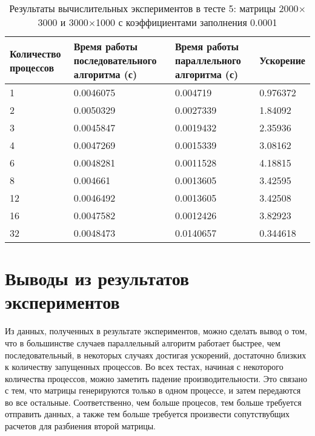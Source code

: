 \documentclass{report}
\begin{document}
\begin{table}[H]
    \caption{Результаты вычислительных экспериментов в тесте 5: матрицы 2000\(\times\)3000 и 3000\(\times\)1000 с коэффициентами заполнения 0.0001}
    \centering
    \begin{tabular}{|m{2cm}|m{5cm}|m{5cm}|m{2cm}|}
        \toprule
        Количество процессов & Время работы последовательного алгоритма (с) & Время работы параллельного алгоритма (с) & Ускорение \\
        \midrule
        1  & 0.0046075 & 0.004719  & 0.976372 \\
        2  & 0.0050329 & 0.0027339 & 1.84092  \\
        3  & 0.0045847 & 0.0019432 & 2.35936  \\
        4  & 0.0047269 & 0.0015339 & 3.08162  \\
        6  & 0.0048281 & 0.0011528 & 4.18815  \\
        8  & 0.004661  & 0.0013605 & 3.42595  \\
        12 & 0.0046492 & 0.0013605 & 3.42508  \\
        16 & 0.0047582 & 0.0012426 & 3.82923  \\
        32 & 0.0048473 & 0.0140657 & 0.344618 \\
        \bottomrule
    \end{tabular}
\end{table}

\clearpage

\section*{Выводы из результатов экспериментов}

\par Из данных, полученных в результате экспериментов, можно сделать вывод о том, что в большинстве случаев параллельный алгоритм работает быстрее, чем последовательный, в некоторых случаях достигая ускорений, достаточно близких к количеству запущенных процессов. Во всех тестах, начиная с некоторого количества процессов, можно заметить падение производительности. Это связано с тем, что матрицы генерируются только в одном процессе, и затем передаются во все остальные. Соответственно, чем больше процесов, тем больше требуется отправить данных, а также тем больше требуется произвести сопутствубщих расчетов для разбиения второй матрицы.
\end{document}
